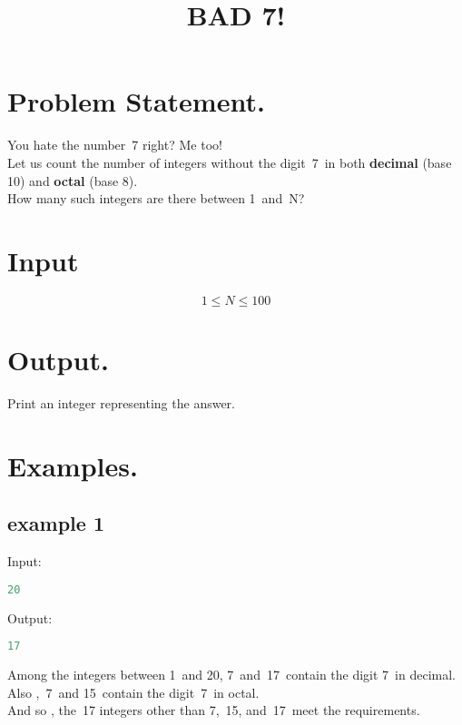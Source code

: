 \documentclass[10pt]{article}
\begin{document}
\title{BAD 7!}
 \date{}
\maketitle
\section{Problem Statement.}
You hate the number 7 right? Me too!\\
Let us count the number of integers without the digit 7 in both \textbf{decimal} (base 10) and \textbf{octal} (base 8).\\
How many such integers are there between 1 and N?
\section{Input}
$$ 1\le N \le 100 $$
\section{Output.}
Print an integer representing the answer.
\section{Examples.}
\subsection{example 1}
Input:
\begin{lstlisting}[language=Python]
20
\end{lstlisting}
Output:
\begin{lstlisting}[language=Python]
17
\end{lstlisting}
Among the integers between 1 and 20, 7 and 17 contain the digit 7 in decimal. Also , 7 and 15 contain the digit 7 in octal.\\
And so , the 17 integers other than 7, 15, and 17 meet the requirements.
\end{document}
